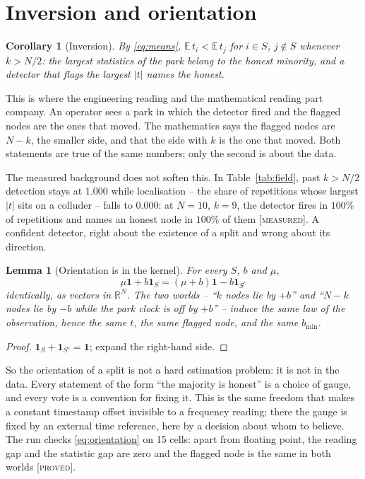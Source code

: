\documentclass[10pt,twocolumn,a4paper]{article}
\newcommand{\proved}{\textcolor{teal!70!black}{\textsc{[proved]}}}
\newcommand{\measured}{\textcolor{blue!70!black}{\textsc{[measured]}}}
\newtheorem{lemma}[theorem]{Lemma}
\newtheorem{corollary}[theorem]{Corollary}
\theoremstyle{definition}
\theoremstyle{remark}
\newcommand{\one}{\mathbf{1}}
\newcommand{\R}{\mathbb{R}}
\newcommand{\bmin}{b_{\min}}
\begin{document}
\section{Inversion and orientation}
\label{sec:inversion}

\begin{corollary}[Inversion]
\label{cor:inversion}
By \eqref{eq:means}, $\mathbb E\,t_i<\mathbb E\,t_j$ for $i\in S$, $j\notin S$
whenever $k>N/2$: the largest statistics of the park belong to the honest
minority, and a detector that flags the largest $|t|$ names the honest.
\end{corollary}

This is where the engineering reading and the mathematical reading part company.
An operator sees a park in which the detector fired and the flagged nodes are the
ones that moved. The mathematics says the flagged nodes are $N-k$, the smaller
side, and that the side with $k$ is the one that moved. Both statements are true
of the same numbers; only the second is about the data.

The measured background does not soften this. In Table~\ref{tab:field}, past
$k>N/2$ detection stays at $1.000$ while localisation -- the share of repetitions
whose largest $|t|$ sits on a colluder -- falls to $0.000$: at $N=10$, $k=9$, the
detector fires in $100\%$ of repetitions and names an honest node in $100\%$ of
them \measured. A confident detector, right about the existence of a split and
wrong about its direction.

\begin{lemma}[Orientation is in the kernel]
\label{lem:orientation}
For every $S$, $b$ and $\mu$,
\begin{equation}
\mu\one+b\one_S=(\mu+b)\one-b\one_{S^c}
\label{eq:orientation}
\end{equation}
identically, as vectors in $\R^N$. The two worlds -- ``$k$ nodes lie by $+b$''
and ``$N-k$ nodes lie by $-b$ while the park clock is off by $+b$'' -- induce the
same law of the observation, hence the same $t$, the same flagged node, and the
same $\bmin$.
\end{lemma}

\begin{proof}
$\one_S+\one_{S^c}=\one$; expand the right-hand side.
\end{proof}

So the orientation of a split is not a hard estimation problem: it is not in the
data. Every statement of the form ``the majority is honest'' is a choice of gauge,
and every vote is a convention for fixing it. This is the same freedom that makes
a constant timestamp offset invisible to a frequency reading; there the gauge is
fixed by an external time reference, here by a decision about whom to believe. The
run checks \eqref{eq:orientation} on 15 cells: apart from floating point, the
reading gap and the statistic gap are zero and the flagged node is the same in
both worlds \proved.
\end{document}
